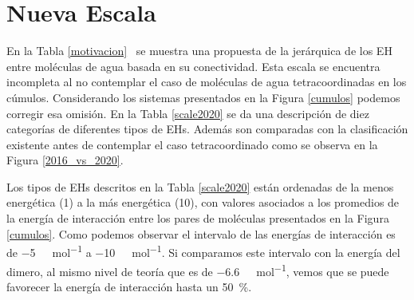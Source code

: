 \section{Nueva Escala}

En la Tabla \ref{motivacion}~\cite{Toche2016} se muestra una propuesta de la
jerárquica de los EH entre moléculas de agua basada en su conectividad. Esta
escala se encuentra incompleta al no contemplar el caso de moléculas de agua
tetracoordinadas en los cúmulos. Considerando los sistemas presentados en la
Figura \ref{cumulos} podemos corregir esa omisión. En la Tabla \ref{scale2020}
se da una descripción de diez categorías de diferentes tipos de EHs. Además son
comparadas con la clasificación existente antes de contemplar el caso
tetracoordinado como se observa en la Figura \ref{2016_vs_2020}.

Los tipos de EHs descritos en la Tabla \ref{scale2020} están ordenadas de la
menos energética (1) a la más energética (10), con valores asociados a los
promedios de la energía de interacción entre los pares de moléculas presentados
en la Figura \ref{cumulos}. Como podemos observar el intervalo de las energías
de interacción es de \SI{-5}{\kilo \calorie \per \mole} a \SI{-10}{\kilo
\calorie \per \mole}. Si comparamos este  intervalo con la energía del dimero,
al mismo nivel de teoría que es de \SI{-6.6}{\kilo \calorie \per \mole}, vemos
que se puede favorecer la energía de interacción hasta un \SI{50}{\percent}.


